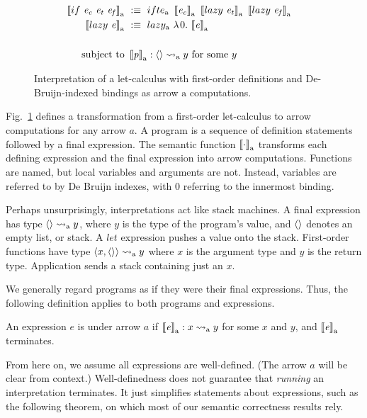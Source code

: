 \documentclass{llncs}
\newcommand{\figref}[1]{Fig.~\ref{#1}}
\newcommand{\arrow}{\rightsquigarrow}
\newcommand{\arrowif}{\ensuremath{ifte}}
\newcommand{\arrowlazy}{\ensuremath{lazy}}
\newcommand{\gen}{_\mathrm{a}}
\begin{document}
\begin{figure}[!tb]
\begin{align*}
\begin{aligned}[t]
\\
	\meaningof{if~\mathit{e_c}~\mathit{e_t}~\mathit{e_f}}\gen &\ :\equiv\
		\arrowif\gen~
			\meaningof{\mathit{e_c}}\gen~
			\meaningof{lazy~\mathit{e_t}}\gen~
			\meaningof{lazy~\mathit{e_f}}\gen
\\
	\meaningof{lazy~\mathit{e}}\gen &\ :\equiv\ \arrowlazy\gen~\fun{0}{\meaningof{\mathit{e}}\gen}
\\
\\
	\text{subject to} &\ \meaningof{\mathit{p}}\gen : \pair{} \arrow\gen y \ \text{for some $y$}
\end{aligned}
\end{align*}
\bottomhrule
\caption[ ]{Interpretation of a let-calculus with first-order definitions and De-Bruijn-indexed bindings as arrow $\mathrm{a}$ computations.
}
\label{fig:semantic-function}
\end{figure}

\figref{fig:semantic-function} defines a transformation from a first-order let-calculus to arrow computations for any arrow $a$.
A program is a sequence of definition statements followed by a final expression.
The semantic function $\meaningof{\cdot}\gen$ transforms each defining expression and the final expression into arrow computations.
Functions are named, but local variables and arguments are not.
Instead, variables are referred to by De Bruijn indexes, with $0$ referring to the innermost binding.

Perhaps unsurprisingly, interpretations act like stack machines.
A final expression has type $\pair{} \arrow\gen y$, where $y$ is the type of the program's value, and $\langle{}\rangle$ denotes an empty list, or stack.
A $let$ expression pushes a value onto the stack.
First-order functions have type $\pair{x,\pair{}} \arrow\gen y$ where $x$ is the argument type and $y$ is the return type.
Application sends a stack containing just an $x$.

We generally regard programs as if they were their final expressions.
Thus, the following definition applies to both programs and expressions.

\begin{definition}
\label{def:well-defined-expression}
An expression $\mathit{e}$ is  under arrow $a$ if $\meaningof{\mathit{e}}\gen : x \arrow\gen y$ for some $x$ and $y$, and $\meaningof{\mathit{e}}\gen$ terminates.
\end{definition}

From here on, we assume all expressions are well-defined.
(The arrow $a$ will be clear from context.)
Well-definedness does not guarantee that \emph{running} an interpretation terminates.
It just simplifies statements about expressions, such as the following theorem, on which most of our semantic correctness results rely.
\end{document}
